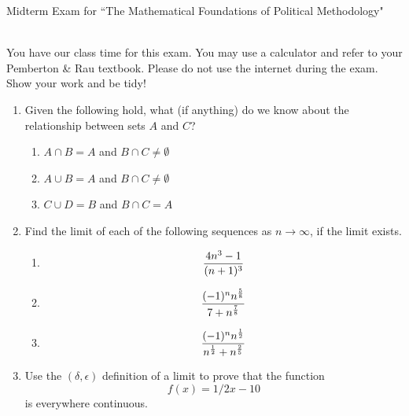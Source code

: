 \documentclass[11pt]{article}
\begin{document}
\noindent \large Midterm Exam for ``The Mathematical Foundations of Political Methodology"

\normalsize
\ \\You have our class time for this exam.  You may use a calculator and refer to your Pemberton \& Rau textbook.  Please do not use the internet during the exam.  Show your work and be tidy!

\begin{enumerate}

\item Given the following hold, what (if anything) do we know about the relationship between sets $A$ and $C$?

\begin{enumerate}
\item $A\cap B= A$ and $B\cap C\not=\emptyset$
\item $A\cup B= A$ and $B\cap C\not=\emptyset$
\item $C \cup D=B$ and $B\cap C=A$

\end{enumerate}

\vspace{.2in}

\item Find the limit of each of the following sequences as $n\rightarrow \infty$, if the limit exists.
\begin{enumerate}
\item $${{4n^3-1}\over{(n+1)^3}}$$
\item $${{(-1)^n n^{5\over 8}}\over{7+n^{7\over 8}}}$$
\item $${{(-1)^n n^{1\over 2}}\over{n^{1\over 2}+n^{2\over 5}}}$$
\end{enumerate}

\vspace{.2in}

\item Use the $(\delta, \epsilon)$ definition of a limit to prove that the function $$f(x)={1/2}x-10$$ is everywhere continuous.



\end{enumerate}
\end{document}
